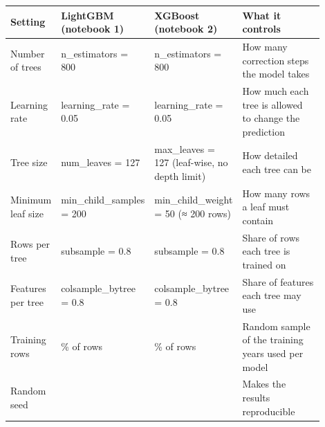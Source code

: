 \begin{tabular}{>{\raggedright\arraybackslash}p{0.16\linewidth}>{\raggedright\arraybackslash}p{0.22\linewidth}>{\raggedright\arraybackslash}p{0.25\linewidth}>{\raggedright\arraybackslash}p{0.27\linewidth}}
\toprule
\textbf{Setting} & \textbf{LightGBM (notebook 1)} & \textbf{XGBoost (notebook 2)} & \textbf{What it controls} \\
\midrule
Number of trees & n\_\allowbreak{}estimators = 800 & n\_\allowbreak{}estimators = 800 & How many correction steps the model takes \\
Learning rate & learning\_\allowbreak{}rate = 0.05 & learning\_\allowbreak{}rate = 0.05 & How much each tree is allowed to change the prediction \\
Tree size & num\_\allowbreak{}leaves = 127 & max\_\allowbreak{}leaves = 127 (leaf-wise, no depth limit) & How detailed each tree can be \\
Minimum leaf size & min\_\allowbreak{}child\_\allowbreak{}samples = 200 & min\_\allowbreak{}child\_\allowbreak{}weight = 50 (≈ 200 rows) & How many rows a leaf must contain \\
Rows per tree & subsample = 0.8 & subsample = 0.8 & Share of rows each tree is trained on \\
Features per tree & colsample\_\allowbreak{}bytree = 0.8 & colsample\_\allowbreak{}bytree = 0.8 & Share of features each tree may use \\
Training rows & 35\% of rows & 35\% of rows & Random sample of the training years used per model \\
Random seed & 0 & 0 & Makes the results reproducible \\
\bottomrule
\end{tabular}
